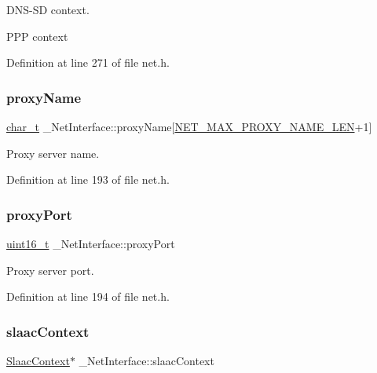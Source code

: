 D\+N\+S-\/\+SD context. 

P\+PP context 

Definition at line 271 of file net.\+h.

\mbox{\label{struct__NetInterface_af649c84aaf6b8d98deaa98881da051a2}} 
\subsubsection{\texorpdfstring{proxy\+Name}{proxyName}}
{\footnotesize\ttfamily \hyperlink{compiler__port_8h_a40bb5262bf908c328fbcfbe5d29d0201}{char\+\_\+t} \+\_\+\+Net\+Interface\+::proxy\+Name\mbox{[}\hyperlink{net_8h_ab0499e73f3380a2848bbfcd69dc109da}{N\+E\+T\+\_\+\+M\+A\+X\+\_\+\+P\+R\+O\+X\+Y\+\_\+\+N\+A\+M\+E\+\_\+\+L\+EN}+1\mbox{]}}



Proxy server name. 



Definition at line 193 of file net.\+h.

\mbox{\label{struct__NetInterface_a1670fe9d288cf4d11bfdf9e61e95752a}} 
\subsubsection{\texorpdfstring{proxy\+Port}{proxyPort}}
{\footnotesize\ttfamily \hyperlink{stdint_8h_a273cf69d639a59973b6019625df33e30}{uint16\+\_\+t} \+\_\+\+Net\+Interface\+::proxy\+Port}



Proxy server port. 



Definition at line 194 of file net.\+h.

\mbox{\label{struct__NetInterface_a21abce085b4de96e1375d6df541ff7c0}} 
\subsubsection{\texorpdfstring{slaac\+Context}{slaacContext}}
{\footnotesize\ttfamily \hyperlink{slaac_8h_a732edbc322eadbd3b8a4eb9574898d31}{Slaac\+Context}$\ast$ \+\_\+\+Net\+Interface\+::slaac\+Context}



